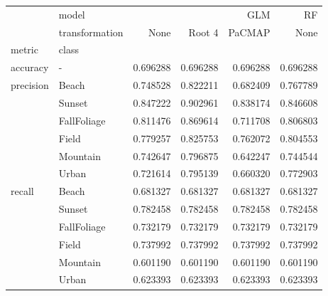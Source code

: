\begin{tabular}{llrrrr}
\toprule
 & model & \multicolumn{3}{r}{GLM} & RF \\
 & transformation & None & Root 4 & PaCMAP & None \\
metric & class &  &  &  &  \\
\midrule
accuracy & - & 0.696288 & 0.696288 & 0.696288 & 0.696288 \\
\cline{1-6}
\multirow[t]{6}{*}{precision} & Beach & 0.748528 & 0.822211 & 0.682409 & 0.767789 \\
 & Sunset & 0.847222 & 0.902961 & 0.838174 & 0.846608 \\
 & FallFoliage & 0.811476 & 0.869614 & 0.711708 & 0.806803 \\
 & Field & 0.779257 & 0.825753 & 0.762072 & 0.804553 \\
 & Mountain & 0.742647 & 0.796875 & 0.642247 & 0.744544 \\
 & Urban & 0.721614 & 0.795139 & 0.660320 & 0.772903 \\
\cline{1-6}
\multirow[t]{6}{*}{recall} & Beach & 0.681327 & 0.681327 & 0.681327 & 0.681327 \\
 & Sunset & 0.782458 & 0.782458 & 0.782458 & 0.782458 \\
 & FallFoliage & 0.732179 & 0.732179 & 0.732179 & 0.732179 \\
 & Field & 0.737992 & 0.737992 & 0.737992 & 0.737992 \\
 & Mountain & 0.601190 & 0.601190 & 0.601190 & 0.601190 \\
 & Urban & 0.623393 & 0.623393 & 0.623393 & 0.623393 \\
\cline{1-6}
\bottomrule
\end{tabular}
